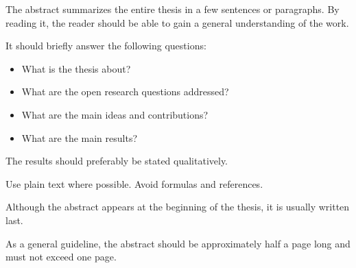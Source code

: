 \begin{otherlanguage}{english}
\addchap{\ThesisStrAbstract}


The abstract summarizes the entire thesis in a few sentences or paragraphs.
By reading it, the reader should be able to gain a general understanding of the work.

It should briefly answer the following questions:
\begin{itemize}
    \item What is the thesis about?
    \item What are the open research questions addressed?
    \item What are the main ideas and contributions?
    \item What are the main results?
\end{itemize}

The results should preferably be stated qualitatively.

Use plain text where possible.
Avoid formulas and references.

Although the abstract appears at the beginning of the thesis, it is usually written last.

As a general guideline, the abstract should be approximately half a page long and must not exceed one page.
\end{otherlanguage}
